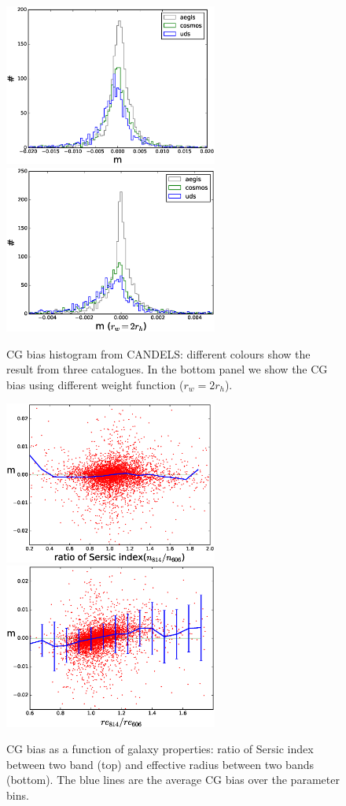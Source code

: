 \documentclass[useAMS,usenatbib]{mn2e}
\begin{document}
%
\begin{figure}
  \includegraphics[width=7.0cm]{zhiscgb.eps}
  \includegraphics[width=7.0cm]{zhiscgbno.eps}
\caption{CG bias histogram from CANDELS: different colours show the
  result from three catalogues. In the bottom panel we show the CG
  bias using different weight function ($r_w = 2r_h$).  }
\label{fig:cgbhis}
\end{figure}
%
%
\begin{figure}
\includegraphics[width=7.0cm]{zcgb-ne17.eps}
\includegraphics[width=7.0cm]{zcgb-re17.eps}
\caption{CG bias as a function of galaxy properties: ratio of Sersic
  index between two band (top) and effective radius between two bands
  (bottom). The blue lines are the average CG bias over the parameter
  bins.}
\label{fig:cg2fitpar}
\end{figure}
\end{document}
